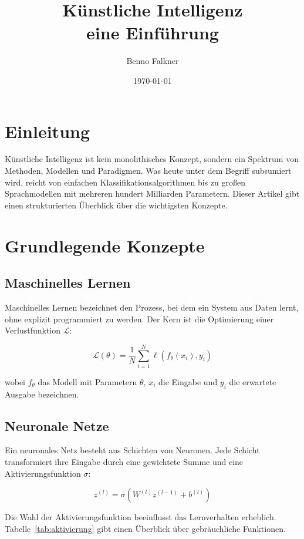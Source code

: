 \documentclass{bfarticle}
\title{Künstliche Intelligenz\\eine Einführung}
\author{Benno Falkner}
\date{\today}
\begin{document}
\maketitle
\tableofcontents

\section{Einleitung}

Künstliche Intelligenz ist kein monolithisches Konzept, sondern ein Spektrum
von Methoden, Modellen und Paradigmen. Was heute unter dem Begriff subsumiert
wird, reicht von einfachen Klassifikationsalgorithmen bis zu großen
Sprachmodellen mit mehreren hundert Milliarden Parametern. Dieser Artikel
gibt einen strukturierten Überblick über die wichtigsten Konzepte.

\section{Grundlegende Konzepte}

\subsection{Maschinelles Lernen}

Maschinelles Lernen bezeichnet den Prozess, bei dem ein System aus Daten
lernt, ohne explizit programmiert zu werden. Der Kern ist die Optimierung
einer Verlustfunktion $\mathcal{L}$:

\[
  \mathcal{L}(\theta) = \frac{1}{N} \sum_{i=1}^{N} \ell(f_\theta(x_i), y_i)
\]

wobei $f_\theta$ das Modell mit Parametern $\theta$, $x_i$ die Eingabe und
$y_i$ die erwartete Ausgabe bezeichnen.

\subsection{Neuronale Netze}

Ein neuronales Netz besteht aus Schichten von Neuronen. Jede Schicht
transformiert ihre Eingabe durch eine gewichtete Summe und eine
Aktivierungsfunktion $\sigma$:

\[
  z^{(l)} = \sigma\!\left(W^{(l)} z^{(l-1)} + b^{(l)}\right)
\]

Die Wahl der Aktivierungsfunktion beeinflusst das Lernverhalten erheblich.
Tabelle~\ref{tab:aktivierung} gibt einen Überblick über gebräuchliche
Funktionen.
\end{document}
